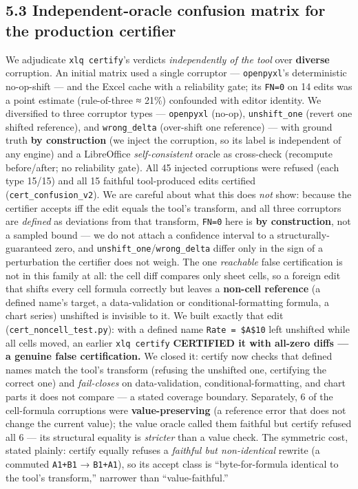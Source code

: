 \documentclass[
  11pt,
]{article}
\begin{document}
\subsection{5.3 Independent-oracle confusion matrix for the production
certifier}\label{independent-oracle-confusion-matrix-for-the-production-certifier}

We adjudicate \texttt{xlq\ certify}'s verdicts \emph{independently of
the tool} over \textbf{diverse} corruption. An initial matrix used a
single corruptor --- \texttt{openpyxl}'s deterministic no-op-shift ---
and the Excel cache with a reliability gate; its \texttt{FN=0} on 14
edits was a point estimate (rule-of-three ≈ 21\%) confounded with editor
identity. We diversified to three corruptor types --- \texttt{openpyxl}
(no-op), \texttt{unshift\_one} (revert one shifted reference), and
\texttt{wrong\_delta} (over-shift one reference) --- with ground truth
\textbf{by construction} (we inject the corruption, so its label is
independent of any engine) and a LibreOffice \emph{self-consistent}
oracle as cross-check (recompute before/after; no reliability gate). All
45 injected corruptions were refused (each type 15/15) and all 15
faithful tool-produced edits certified (\texttt{cert\_confusion\_v2}).
We are careful about what this does \emph{not} show: because the
certifier accepts iff the edit equals the tool's transform, and all
three corruptors are \emph{defined} as deviations from that transform,
\texttt{FN=0} here is \textbf{by construction}, not a sampled bound ---
we do not attach a confidence interval to a structurally-guaranteed
zero, and \texttt{unshift\_one}/\texttt{wrong\_delta} differ only in the
sign of a perturbation the certifier does not weigh. The one
\emph{reachable} false certification is not in this family at all: the
cell diff compares only sheet cells, so a foreign edit that shifts every
cell formula correctly but leaves a \textbf{non-cell reference} (a
defined name's target, a data-validation or conditional-formatting
formula, a chart series) unshifted is invisible to it. We built exactly
that edit (\texttt{cert\_noncell\_test.py}): with a defined name
\texttt{Rate\ =\ \$A\$10} left unshifted while all cells moved, an
earlier \texttt{xlq\ certify} \textbf{CERTIFIED it with all-zero diffs
--- a genuine false certification.} We closed it: certify now checks
that defined names match the tool's transform (refusing the unshifted
one, certifying the correct one) and \emph{fail-closes} on
data-validation, conditional-formatting, and chart parts it does not
compare --- a stated coverage boundary. Separately, 6 of the
cell-formula corruptions were \textbf{value-preserving} (a reference
error that does not change the current value); the value oracle called
them faithful but certify refused all 6 --- its structural equality is
\emph{stricter} than a value check. The symmetric cost, stated plainly:
certify equally refuses a \emph{faithful but non-identical} rewrite (a
commuted \texttt{A1+B1} → \texttt{B1+A1}), so its accept class is
``byte-for-formula identical to the tool's transform,'' narrower than
``value-faithful.''
\end{document}
